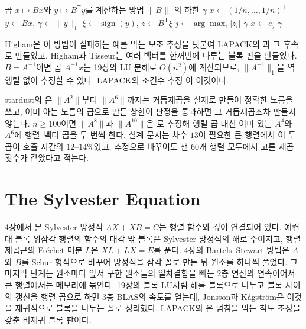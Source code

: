\begin{algorithm}[t]
\begin{algorithmic}[1]
\Require 곱 $x\mapsto Bx$와 $y\mapsto B^{\mathsf T}y$를 계산하는 방법
\Ensure $\|B\|_1$의 하한 $\gamma$
\State $x\gets(1/n,\dots,1/n)^{\mathsf T}$
\Repeat
  \State $y\gets Bx$, $\gamma\gets\|y\|_1$
  \State $\xi\gets\operatorname{sign}(y)$, $z\gets B^{\mathsf T}\xi$
  \State $j\gets\arg\max_i|z_i|$
   \Return $\gamma$ 
  \EndIf
  \State $x\gets e_j$
\State \Return $\gamma$
\end{algorithmic}
\caption{Hager의 1-노름 추정}
\label{alg:hager}
\end{algorithm}

Higham은 이 방법이 실패하는 예를 막는 보조 추정을 덧붙여 LAPACK의 과 그 후속 로 만들었고\cite{higham1988lacon}, Higham과 Tisseur는 여러 벡터를 한꺼번에 다루는 블록 판을 만들었다\cite{higham2000block}. $B=A^{-1}$이면 곱 $A^{-1}x$는 19장의 LU 분해로 $O(n^2)$에 계산되므로, $\|A^{-1}\|_1$을 역행렬 없이 추정할 수 있다. LAPACK의 조건수 추정 이 이것이다.

\begin{instardust}
stardust의 은 $\|A^2\|$부터 $\|A^6\|$까지는 거듭제곱을 실제로 만들어 정확한 노름을 쓰고, 이미 아는 노름의 곱으로 만든 상한이 판정을 통과하면 그 거듭제곱조차 만들지 않는다. $n\ge100$이면 $\|A^8\|$과 $\|A^{10}\|$은 로 추정해 행렬 곱 대신 이미 있는 $A^4$와 $A^6$에 행렬--벡터 곱을 두 번씩 한다. 설계 문서는 차수 $13$이 필요한 큰 행렬에서 이 두 곱이 호출 시간의 $12$--$14\%$였고, 추정으로 바꾸어도 잰 $60$개 행렬 모두에서 고른 제곱 횟수가 같았다고 적는다.
\end{instardust}

\section{The Sylvester Equation}
\label{sec:sylvester}

4장에서 본 Sylvester 방정식 $AX+XB=C$는 행렬 함수와 깊이 연결되어 있다. 예컨대 블록 위삼각 행렬의 함수의 대각 밖 블록은 Sylvester 방정식의 해로 주어지고, 행렬 제곱근의 Fréchet 미분 $L$은 $XL+LX=E$를 푼다. 4장의 Bartels--Stewart 방법은 $A$와 $B$를 Schur 형식으로 바꾸어 방정식을 삼각 꼴로 만든 뒤 원소를 하나씩 풀었다\cite{bartels1972stewart}. 그 마지막 단계는 원소마다 앞서 구한 원소들의 일차결합을 빼는 2층 연산의 연속이어서 큰 행렬에서는 메모리에 묶인다. 19장의 블록 LU처럼 해를 블록으로 나누고 블록 사이의 갱신을 행렬 곱으로 하면 3층 BLAS의 속도를 얻는데, Jonsson과 Kågström은 이것을 재귀적으로 블록을 나누는 꼴로 정리했다\cite{jonsson2002recsy}. LAPACK의 은 넘침을 막는 척도 조정을 갖춘 비재귀 블록 판이다.

